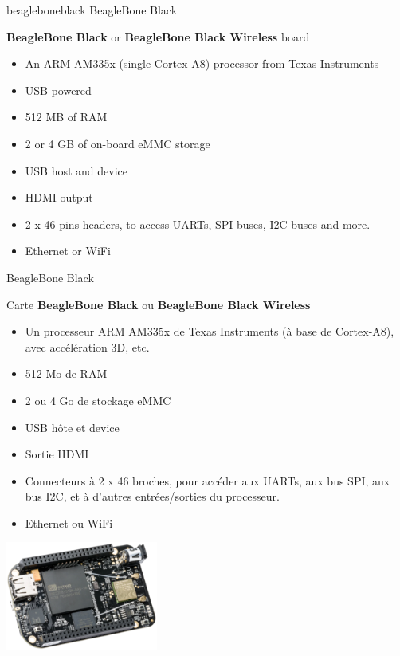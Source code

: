 {beagleboneblack}
{BeagleBone Black}
{
  {\bf BeagleBone Black} or {\bf BeagleBone Black Wireless} board
  \vspace{0.5cm}
  \begin{itemize}
  \item An ARM AM335x (single Cortex-A8) processor from Texas
    Instruments
  \item USB powered
  \item 512 MB of RAM
  \item 2 or 4 GB of on-board eMMC storage
  \item USB host and device
  \item HDMI output
  \item 2 x 46 pins headers, to access UARTs, SPI buses, I2C buses
    and more.
  \item Ethernet or WiFi
  \end{itemize}
  \vspace{-0.7cm}
}
{BeagleBone Black}
{
  Carte {\bf BeagleBone Black} ou {\bf BeagleBone Black Wireless}
  \vspace{0.5cm}
  \begin{itemize}
  \item Un processeur ARM AM335x de Texas Instruments (à base de
    Cortex-A8), avec accélération 3D, etc.
  \item 512 Mo de RAM
  \item 2 ou 4 Go de stockage eMMC
  \item USB hôte et device
  \item Sortie HDMI
  \item Connecteurs à 2 x 46 broches, pour accéder aux UARTs, aux bus
    SPI, aux bus I2C, et à d'autres entrées/sorties du processeur.
  \item Ethernet ou WiFi
  \vspace{-0.7cm}
  \end{itemize}
}
{
  \begin{center}
    \includegraphics[width=5cm]{../slides/beagleboneblack-board/beagleboneblack_sd.png}
  \end{center}
}

